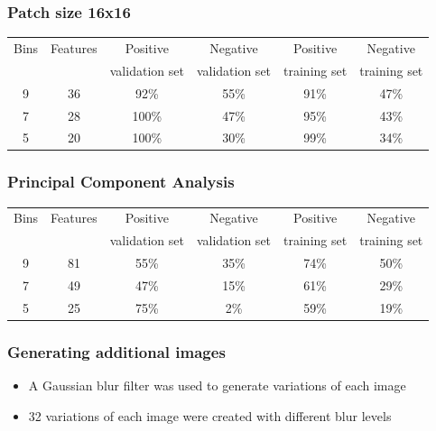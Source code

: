 \documentclass[serif,14pt]{beamer}
\begin{document}
\begin{frame}
  \frametitle{Patch size 16x16}
  
\begin{scriptsize}  
\begin{tabular}{| c | c | c | c | c | c |}
\hline
Bins & Features &  Positive  & Negative  & Positive  & Negative \\

& & validation set & validation set & training set & training set \\
\hline
9 & 36 & 92\% & 55\% & 91\% & 47\% \\
7& 28 & 100\% & 47\% & 95\% & 43\% \\
5& 20 & 100\% & 30\% & 99\% & 34\% \\
\hline
\end{tabular}
\end{scriptsize}
\end{frame}

\begin{frame}
  \frametitle{Principal Component Analysis}
  \begin{scriptsize} 
\begin{tabular}{| c | c | c | c | c | c |}
\hline
Bins & Features &  Positive  & Negative  & Positive  & Negative \\

& & validation set & validation set & training set & training set \\
\hline
9 & 81 & 55\% & 35\% & 74\% & 50\% \\
7& 49 & 47\% & 15\% & 61\% & 29\% \\
5& 25 & 75\% & 2\% & 59\% & 19\% \\
\hline
\end{tabular}
\end{scriptsize} 
\end{frame}


\begin{frame}

  \frametitle{Generating additional images}
  
  \begin{itemize}
      \item A Gaussian blur filter was used to generate variations of each image
      \item 32 variations of each image were created with different blur levels
  \end{itemize}
  
\end{frame}
\end{document}

